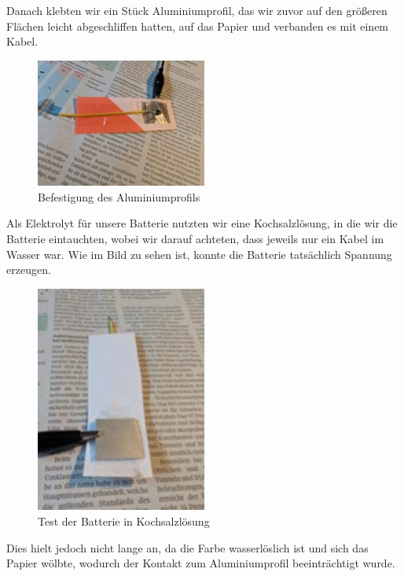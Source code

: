 \documentclass[a4paper,12pt]{article}
\begin{document}
Danach klebten wir ein Stück Aluminiumprofil, das wir zuvor auf den größeren Flächen leicht abgeschliffen hatten, auf das Papier und verbanden es mit einem Kabel.

\begin{figure}[h!]
\centering
\includegraphics[width=0.5\textwidth]{Bild4}
\caption{Befestigung des Aluminiumprofils}
\label{fig:bild4}
\end{figure}

Als Elektrolyt für unsere Batterie nutzten wir eine Kochsalzlösung, in die wir die Batterie eintauchten, wobei wir darauf achteten, dass jeweils nur ein Kabel im Wasser war. Wie im Bild zu sehen ist, konnte die Batterie tatsächlich Spannung erzeugen.

\begin{figure}[h!]
\centering
\includegraphics[width=0.5\textwidth]{Bild5}
\caption{Test der Batterie in Kochsalzlösung}
\label{fig:bild5}
\end{figure}

Dies hielt jedoch nicht lange an, da die Farbe wasserlöslich ist und sich das Papier wölbte, wodurch der Kontakt zum Aluminiumprofil beeinträchtigt wurde.
\end{document}
